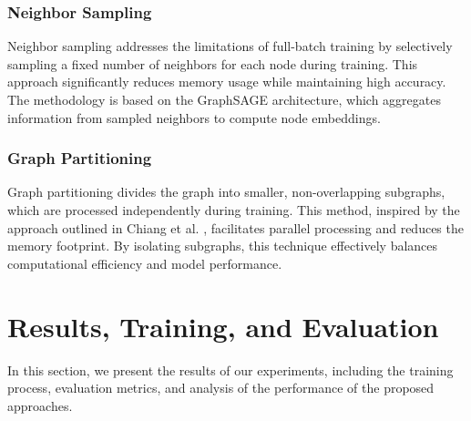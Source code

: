 \documentclass{article}
\begin{document}
\subsubsection{Neighbor Sampling}
Neighbor sampling addresses the limitations of full-batch training by selectively sampling a fixed number of neighbors for each node during training. This approach significantly reduces memory usage while maintaining high accuracy. The methodology is based on the GraphSAGE architecture, which aggregates information from sampled neighbors to compute node embeddings.

\subsubsection{Graph Partitioning}
Graph partitioning divides the graph into smaller, non-overlapping subgraphs, which are processed independently during training. This method, inspired by the approach outlined in Chiang et al. \cite{Chiang_2019}, facilitates parallel processing and reduces the memory footprint. By isolating subgraphs, this technique effectively balances computational efficiency and model performance.




\section{Results, Training, and Evaluation}

In this section, we present the results of our experiments, including the training process, evaluation metrics, and analysis of the performance of the proposed approaches.
\end{document}

